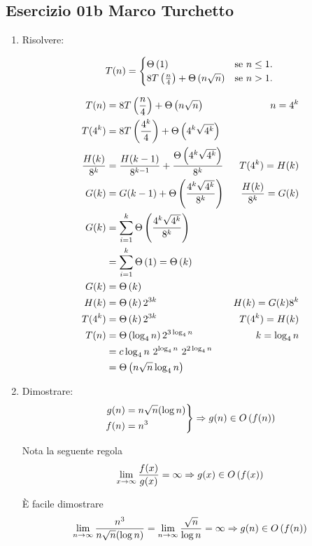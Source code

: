 
\subsection[01b MT]{Esercizio 01b Marco Turchetto}
\begin{enumerate}[label=\alph*)]
\item Risolvere:

\begin{equation}
	T(n)=\begin{cases}
		\Theta\left(1\right)							            & \text{se $n \leq 1$}.\\
		\text{$8T\left( \frac{n}{4} \right) + \Theta\left(n \sqrt{n}\right) $} & \text{se $n > 1$}.
 	\end{cases}
\end{equation}

\begin{align*}
	T(n) &= 8T\left(\frac{n}{4}\right) + \Theta\left( n \sqrt{n}\right)  & n = 4^k \\
	T(4^k) &= 8T\left(\frac{4^k}{4}\right) + \Theta\left(4^k \sqrt{4^k}\right) \\
	\frac{H(k)}{8^k} &= \frac{H(k-1)}{8^{k-1}} + \frac{\Theta\left(4^k \sqrt{4^k}\right)}{8^k} & T(4^k) = H(k) \\
	G(k) &= G(k-1) + \Theta\left(\frac{4^k \sqrt{4^k}}{8^k}\right) & \frac{H(k)}{8^k} = G(k)\\
	G(k) &= \sum _{i=1} ^{k} \Theta\left(\frac{4^k \sqrt{4^k}}{8^k}\right) \\
	     &= \sum _{i=1} ^{k} \Theta\left(1\right) = \Theta\left(k\right) \\
	G(k) &= \Theta\left(k\right) \\
	H(k) &= \Theta\left(k\right) 2^{3k} & H(k) = G(k) 8^k\\
	T(4^k) &= \Theta\left(k\right) 2^{3k} & T(4^k) = H(k) \\
	T(n) &= \Theta\left(\log _4 n\right) 2^{3 \log_4 n} & k= \log_4 n \\ 
	     &= c \log _4 n \ 2^{\log_4 n} \ 2 ^ {2 \log _ 4 n} \\
	     &= \Theta\left(n \sqrt{n} \log_4 n\right)
\end{align*}

\item Dimostrare:
\begin{equation*}
\left.
	\begin{aligned}
		g(n) &= n \sqrt{n}(\log n) \\
		f(n) &= n^3
	\end{aligned}
\right \} \Rightarrow  g(n) \in O\left(f(n)\right) 
\end{equation*}

Nota la seguente regola
\begin{equation*}
	\lim _{x \to \infty} \frac{f(x)}{g(x)} = \infty \Rightarrow g(x) \in O\left(f(x)\right)
\end{equation*}

\`{E} facile dimostrare
\begin{align*}
	\lim _{n \to \infty} \frac{n^3}{n \sqrt{n}(\log n)} = \lim _{n \to \infty} \frac{\sqrt{n}}{ \log n} = \infty \Rightarrow g(n) \in O\left(f(n)\right)
\end{align*}
\end{enumerate}
